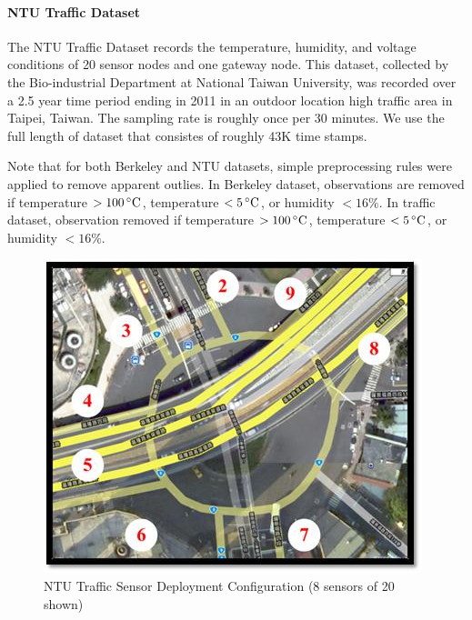 \paragraph*{NTU Traffic Dataset}

The NTU Traffic Dataset records the temperature, humidity, and voltage conditions of 20 sensor nodes and one gateway node.
This dataset, collected by the Bio-industrial Department at National Taiwan University, was recorded over a 2.5 year time period ending in 2011 in an outdoor location high traffic area in Taipei, Taiwan\cite{liu2011developed}. The sampling rate is roughly once per 30 minutes. We use the full length of dataset that consistes of roughly 43K time stamps.

Note that for both Berkeley and NTU datasets, simple preprocessing rules were applied to remove apparent outlies. In Berkeley dataset, observations are removed if temperature \mbox{$>100\,^{\circ}\mathrm{C}$}, temperature \mbox{$<5\,^{\circ}\mathrm{C}$}, or humidity \mbox{$<16\%$}. In traffic dataset, observation removed if temperature \mbox{$>100\,^{\circ}\mathrm{C}$}, temperature \mbox{$<5\,^{\circ}\mathrm{C}$}, or humidity \mbox{$<16\%$}.
\begin{figure}[H]
\centering
\includegraphics[scale=0.5]{traffic_wsn.png}
\caption{NTU Traffic Sensor Deployment Configuration (8 sensors of 20 shown)}
\end{figure}



